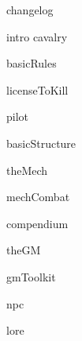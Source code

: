 \documentclass[11pt]{report}
\begin{document}
{changelog}
\newpage

\setcounter{secnumdepth}{-2}
\setcounter{tocdepth}{7}

\tableofcontents
\newpage


{intro}
{cavalry}
\newpage

{basicRules}
\newpage


{licenseToKill}
\newpage

{pilot}
\newpage

{basicStructure}
\newpage


{theMech}
\newpage

{mechCombat}
\newpage


{compendium}
\newpage

{theGM}
\newpage


{gmToolkit}
\newpage


{npc}
\newpage


{lore}
\newpage
\end{document}
